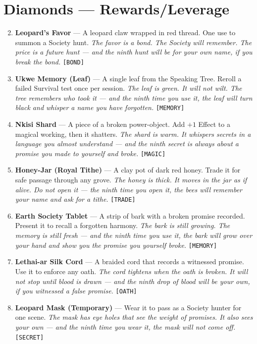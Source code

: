 \section*{Diamonds --- Rewards/Leverage}
\label{sec:sekogo-rewards}
\begin{enumerate}
\setcounter{enumi}{1}
\item \textbf{Leopard's Favor} --- A leopard claw wrapped in red thread. One use to summon a Society hunt.
  \hfill \textit{The favor is a bond. The Society will remember. The price is a future hunt --- and the ninth hunt will be for your own name, if you break the bond.} \texttt{[BOND]}
\item \textbf{Ukwe Memory (Leaf)} --- A single leaf from the Speaking Tree. Reroll a failed Survival test once per session.
  \hfill \textit{The leaf is green. It will not wilt. The tree remembers who took it --- and the ninth time you use it, the leaf will turn black and whisper a name you have forgotten.} \texttt{[MEMORY]}
\item \textbf{Nkisi Shard} --- A piece of a broken power-object. Add $+1$ Effect to a magical working, then it shatters.
  \hfill \textit{The shard is warm. It whispers secrets in a language you almost understand --- and the ninth secret is always about a promise you made to yourself and broke.} \texttt{[MAGIC]}
\item \textbf{Honey-Jar (Royal Tithe)} --- A clay pot of dark red honey. Trade it for safe passage through any grove.
  \hfill \textit{The honey is thick. It moves in the jar as if alive. Do not open it --- the ninth time you open it, the bees will remember your name and ask for a tithe.} \texttt{[TRADE]}
\item \textbf{Earth Society Tablet} --- A strip of bark with a broken promise recorded. Present it to recall a forgotten harmony.
  \hfill \textit{The bark is still growing. The memory is still fresh --- and the ninth time you use it, the bark will grow over your hand and show you the promise you yourself broke.} \texttt{[MEMORY]}
\item \textbf{Lethai-ar Silk Cord} --- A braided cord that records a witnessed promise. Use it to enforce any oath.
  \hfill \textit{The cord tightens when the oath is broken. It will not stop until blood is drawn --- and the ninth drop of blood will be your own, if you witnessed a false promise.} \texttt{[OATH]}
\item \textbf{Leopard Mask (Temporary)} --- Wear it to pass as a Society hunter for one scene.
  \hfill \textit{The mask has eye holes that see the weight of promises. It also sees your own --- and the ninth time you wear it, the mask will not come off.} \texttt{[SECRET]}

\end{enumerate}
